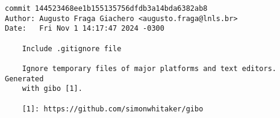 \begin{verbatim}
commit 144523468ee1b155135756dfdb3a14bda6382ab8
Author: Augusto Fraga Giachero <augusto.fraga@lnls.br>
Date:   Fri Nov 1 14:17:47 2024 -0300

    Include .gitignore file
    
    Ignore temporary files of major platforms and text editors. Generated
    with gibo [1].
    
    [1]: https://github.com/simonwhitaker/gibo
\end{verbatim}
